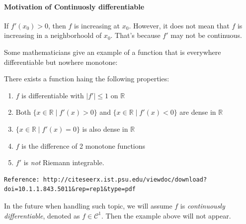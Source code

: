 \paragraph{Motivation of Continuosly differentiable}
\begin{remark}
If $f'(x_0)>0$, then $f$ is increasing at $x_0$. However, it does not mean that $f$ is increasing in a neighborhoold of $x_0$. That's because $f'$ may not be continuous.
\end{remark}
Some mathematicians give an example of a function that is everywhere differentiable but nowhere monotone:
\begin{example}
There exists a function haing the following properties:
\begin{enumerate}
\item
$f$ is differentiable with $|f'|\le1$ on $\mathbb{R}$
\item
Both $\{x\in\mathbb{R}\mid f'(x)>0\}$ and $\{x\in\mathbb{R}\mid f'(x)<0\}$ are dense in $\mathbb{R}$
\item
$\{x\in\mathbb{R}\mid f'(x)=0\}$ is also dense in $\mathbb{R}$
\item
$f$ is the difference of 2 monotone functions
\item
$f'$ is \emph{not} Riemann integrable.
\end{enumerate}
\begin{verbatim}
Reference: http://citeseerx.ist.psu.edu/viewdoc/download?
doi=10.1.1.843.5011&rep=rep1&type=pdf
\end{verbatim}
\end{example}
In the future when handling such topic, we will assume $f$ is \emph{continuously differentiable}, denoted as $f\in\mathcal{C}^1$. Then the example above will not appear.









